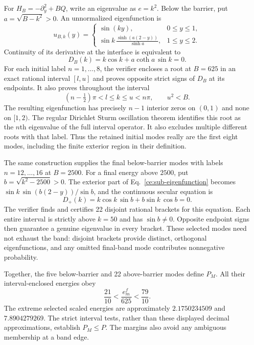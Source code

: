 \documentclass[aps,prl,reprint,superscriptaddress,longbibliography]{revtex4-2}
\begin{document}
For $H_B=-\partial_y^2+BQ$, write an eigenvalue as $e=k^2$. Below the barrier,
put $a=\sqrt{B-k^2}>0$. An unnormalized eigenfunction is
\begin{equation}
 u_{B,k}(y)=
 \begin{cases}
  \sin(ky),&0\le y\le1,\\
  \displaystyle\sin k\,
       \frac{\sinh(a(2-y))}{\sinh a},&1\le y\le2.
 \end{cases}
 \label{ce:sub-eigenfunction}
\end{equation}
Continuity of its derivative at the interface is equivalent to
\begin{equation}
 D_B(k)=k\cos k+a\coth a\,\sin k=0.
 \label{ce:sub-secular}
\end{equation}
For each initial label $n=1,\ldots,8$, the verifier encloses a root at
$B=625$ in an exact rational interval $[l,u]$ and proves opposite strict
signs of $D_B$ at its endpoints. It also proves throughout the interval
\begin{equation}
 (n-\tfrac12)\pi<l\le k\le u<n\pi,\qquad u^2<B.
 \label{ce:nodal-bracket}
\end{equation}
The resulting eigenfunction has precisely $n-1$ interior zeros on $(0,1)$
and none on $[1,2)$. The regular Dirichlet Sturm oscillation theorem
identifies this root as the $n$th eigenvalue of the full interval operator.
It also excludes multiple different roots with that label. Thus the
retained initial modes really are the first eight modes, including the
finite exterior region in their definition.

The same construction supplies the final below-barrier modes with labels
$n=12,\ldots,16$ at $B=2500$. For a final energy above $2500$, put
$b=\sqrt{k^2-2500}>0$. The exterior part of
Eq.~\eqref{ce:sub-eigenfunction} becomes
$\sin k\,\sin(b(2-y))/\sin b$, and the continuous secular equation is
\begin{equation}
 D_+(k)=k\cos k\,\sin b+b\sin k\,\cos b=0.
 \label{ce:super-secular}
\end{equation}
The verifier finds and certifies 22 disjoint rational brackets for this
equation. Each entire interval is strictly above $k=50$ and has
$\sin b\ne0$. Opposite endpoint signs then guarantee a genuine eigenvalue
in every bracket. These selected modes need not exhaust the band:
disjoint brackets provide distinct, orthogonal eigenfunctions, and any
omitted final-band mode contributes nonnegative probability.

Together, the five below-barrier and 22 above-barrier modes define $P_M$.
All their interval-enclosed energies obey
\begin{equation}
 \frac{21}{10}<\frac{e_m^f}{625}<\frac{79}{10}.
 \label{ce:interior-band}
\end{equation}
The extreme selected scaled energies are approximately $2.1750234509$
and $7.8904279269$. The strict interval tests, rather than these displayed
decimal approximations, establish $P_M\le P$. The margins also avoid any
ambiguous membership at a band edge.
\end{document}
